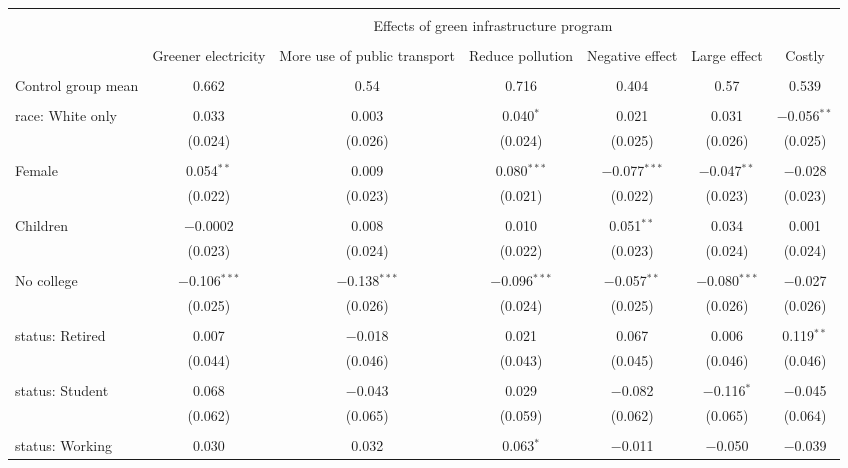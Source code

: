 
\begin{tabular}{@{\extracolsep{5pt}}lcccccc} 
\\[-1.8ex]\hline 
\hline \\[-1.8ex] 
 & \multicolumn{6}{c}{Effects of green infrastructure program} \\ 
\cline{2-7} 
\\[-1.8ex] & Greener electricity & More use of public transport & Reduce pollution & Negative effect & Large effect & Costly \\ 
\hline \\[-1.8ex] 
 Control group mean & 0.662 & 0.54 & 0.716 & 0.404 & 0.57 & 0.539  \\ \hline \\[-1.8ex] race: White only & 0.033 & 0.003 & 0.040$^{*}$ & 0.021 & 0.031 & $-$0.056$^{**}$ \\ 
  & (0.024) & (0.026) & (0.024) & (0.025) & (0.026) & (0.025) \\ 
  & & & & & & \\ 
 Female & 0.054$^{**}$ & 0.009 & 0.080$^{***}$ & $-$0.077$^{***}$ & $-$0.047$^{**}$ & $-$0.028 \\ 
  & (0.022) & (0.023) & (0.021) & (0.022) & (0.023) & (0.023) \\ 
  & & & & & & \\ 
 Children & $-$0.0002 & 0.008 & 0.010 & 0.051$^{**}$ & 0.034 & 0.001 \\ 
  & (0.023) & (0.024) & (0.022) & (0.023) & (0.024) & (0.024) \\ 
  & & & & & & \\ 
 No college & $-$0.106$^{***}$ & $-$0.138$^{***}$ & $-$0.096$^{***}$ & $-$0.057$^{**}$ & $-$0.080$^{***}$ & $-$0.027 \\ 
  & (0.025) & (0.026) & (0.024) & (0.025) & (0.026) & (0.026) \\ 
  & & & & & & \\ 
 status: Retired & 0.007 & $-$0.018 & 0.021 & 0.067 & 0.006 & 0.119$^{**}$ \\ 
  & (0.044) & (0.046) & (0.043) & (0.045) & (0.046) & (0.046) \\ 
  & & & & & & \\ 
 status: Student & 0.068 & $-$0.043 & 0.029 & $-$0.082 & $-$0.116$^{*}$ & $-$0.045 \\ 
  & (0.062) & (0.065) & (0.059) & (0.062) & (0.065) & (0.064) \\ 
  & & & & & & \\ 
 status: Working & 0.030 & 0.032 & 0.063$^{*}$ & $-$0.011 & $-$0.050 & $-$0.039 \\ 

\end{tabular}
